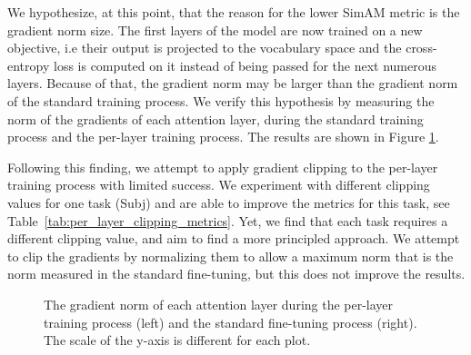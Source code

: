 \documentclass[11pt]{article}
\begin{document}
We hypothesize, at this point, that the reason for the lower SimAM metric is the gradient norm size.
The first layers of the model are now trained on a new objective, i.e their output is projected to the vocabulary space and the cross-entropy loss is computed on it instead of being passed for the next numerous layers.
Because of that, the gradient norm may be larger than the gradient norm of the standard training process.
We verify this hypothesis by measuring the norm of the gradients of each attention layer, during the standard training process and the per-layer training process.
The results are shown in Figure \ref{grad_norm}.

Following this finding, we attempt to apply gradient clipping to the per-layer training process with limited success.
We experiment with different clipping values for one task (Subj) and are able to improve the metrics for this task, see Table~\ref{tab:per_layer_clipping_metrics}.
Yet, we find that each task requires a different clipping value, and aim to find a more principled approach.
We attempt to clip the gradients by normalizing them to allow a maximum norm that is the norm measured in the standard fine-tuning, but this does not improve the results.


\begin{figure}%
	\centering
	\caption{The gradient norm of each attention layer during the per-layer training process (left) and the standard fine-tuning process (right). The scale of the y-axis is different for each plot.}
	\label{grad_norm}
\end{figure}
\end{document}
